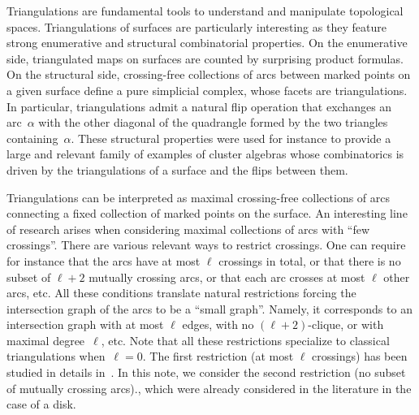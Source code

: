 \documentclass{amsart}
\theoremstyle{remark}
\begin{document}
Triangulations are fundamental tools to understand and manipulate topological spaces.
Triangulations of surfaces are particularly interesting as they feature strong enumerative and structural combinatorial properties.
On the enumerative side, triangulated maps on surfaces are counted by surprising product formulas. %
On the structural side, crossing-free collections of arcs between marked points on a given surface define a pure simplicial complex, whose facets are triangulations.
In particular, triangulations admit a natural flip operation that exchanges an arc~$\alpha$ with the other diagonal of the quadrangle formed by the two triangles containing~$\alpha$.
These structural properties were used for instance to provide a large and relevant family of examples of cluster algebras whose combinatorics is driven by the triangulations of a surface and the flips between them.

Triangulations can be interpreted as maximal crossing-free collections of arcs connecting a fixed collection of marked points on the surface.
An interesting line of research arises when considering maximal collections of arcs with ``few crossings''.
There are various relevant ways to restrict crossings.
One can require for instance that the arcs have at most $\ell$ crossings in total, or that there is no subset of $\ell+2$ mutually crossing arcs, or that each arc crosses at most $\ell$ other arcs, etc.
All these conditions translate natural restrictions forcing the intersection graph of the arcs to be a ``small graph''.
Namely, it corresponds to an intersection graph with at most $\ell$ edges, with no $(\ell+2)$-clique, or with maximal degree~$\ell$, etc.
Note that all these restrictions specialize to classical triangulations when~$\ell = 0$.
The first restriction (at most $\ell$ crossings) has been studied in details in~\cite{PilaudRue}.
In this note, we consider the second restriction (no subset of mutually crossing arcs)., which were already considered in the literature in the case of a disk.
\end{document}
